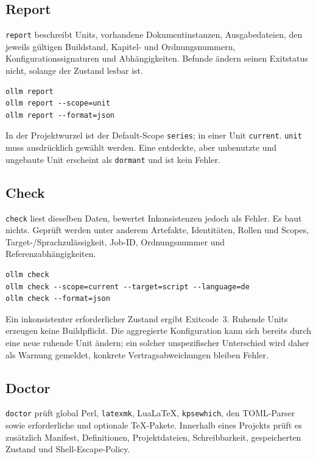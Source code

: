 \documentclass[
load-preamble+
]{osgdoc}
\begin{document}
\subsection{Report}

\texttt{report} beschreibt Units, vorhandene Dokumentinstanzen,
Ausgabedateien, den jeweils gültigen Buildstand, Kapitel- und Ordnungsnummern, Konfigurationssignaturen und
Abhängigkeiten. Befunde ändern seinen Exitstatus nicht, solange der Zustand
lesbar ist.

\begin{verbatim}
ollm report
ollm report --scope=unit
ollm report --format=json
\end{verbatim}

In der Projektwurzel ist der Default-Scope \texttt{series}; in einer Unit
\texttt{current}. \texttt{unit} muss ausdrücklich gewählt werden. Eine
entdeckte, aber unbenutzte und ungebaute Unit erscheint als \texttt{dormant}
und ist kein Fehler.

\subsection{Check}

\texttt{check} liest dieselben Daten, bewertet Inkonsistenzen jedoch als
Fehler. Es baut nichts. Geprüft werden unter anderem Artefakte, Identitäten,
Rollen und Scopes, Target-/Sprachzulässigkeit, Job-ID, Ordnungsnummer und
Referenzabhängigkeiten.

\begin{verbatim}
ollm check
ollm check --scope=current --target=script --language=de
ollm check --format=json
\end{verbatim}

Ein inkonsistenter erforderlicher Zustand ergibt Exitcode~3. Ruhende Units
erzeugen keine Buildpflicht. Die aggregierte Konfiguration kann sich bereits
durch eine neue ruhende Unit ändern; ein solcher unspezifischer Unterschied
wird daher als Warnung gemeldet, konkrete Vertragsabweichungen bleiben Fehler.

\subsection{Doctor}

\texttt{doctor} prüft global Perl, \texttt{latexmk}, LuaLaTeX,
\texttt{kpsewhich}, den TOML-Parser sowie erforderliche und optionale
TeX-Pakete. Innerhalb eines Projekts prüft es zusätzlich Manifest,
Definitionen, Projektdateien, Schreibbarkeit, gespeicherten Zustand und
Shell-Escape-Policy.
\end{document}
